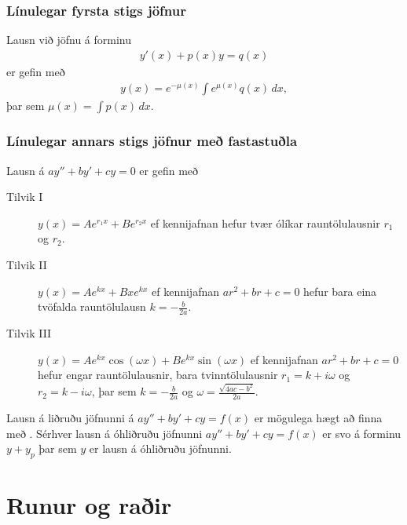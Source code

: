 \documentclass[a4paper,10pt,icelandic]{sphinxmanual}
\begin{document}
\subsection{Línulegar fyrsta stigs jöfnur}
\label{\detokenize{kafli08:linulegar-fyrsta-stigs-jofnur}}
Lausn við jöfnu á forminu
\begin{equation*}
\begin{split}y'(x) + p(x)y = q(x)\end{split}
\end{equation*}
er gefin með
\begin{equation*}
\begin{split}y(x) = e^{-\mu(x)} \int e^{\mu(x)} q(x)\, dx,\end{split}
\end{equation*}
þar sem \(\mu(x) = \int p(x)\, dx\).


\subsection{Línulegar annars stigs jöfnur með fastastuðla}
\label{\detokenize{kafli08:linulegar-annars-stigs-jofnur-me-fastastula}}
Lausn á \(ay''+by'+cy=0\) er gefin með
\begin{description}
\item[{Tilvik I}] \leavevmode
\(y(x)=Ae^{r_1x}+Be^{r_2x}\)
ef kennijafnan hefur tvær ólíkar rauntölulausnir \(r_1\) og
\(r_2\).

\item[{Tilvik II}] \leavevmode
\(y(x)=Ae^{kx}+Bxe^{kx}\)
ef kennijafnan \(ar^2+br+c=0\) hefur bara eina tvöfalda rauntölulausn
\(k=-\frac{b}{2a}\).

\item[{Tilvik III}] \leavevmode
\(y(x)=Ae^{kx}\cos(\omega x)+Be^{kx}\sin(\omega x)\)
ef kennijafnan \(ar^2+br+c=0\) hefur engar rauntölulausnir,
bara tvinntölulausnir \(r_1=k+i\omega\) og
\(r_2=k-i\omega\), þar sem
\(k=-\frac{b}{2a}\) og \(\omega=\frac{\sqrt{4ac-b^2}}{2a}\).

\end{description}

Lausn á liðruðu jöfnunni  á \(ay''+by'+cy=f(x)\) er mögulega hægt að finna
með {\hyperref[\detokenize{kafli08:agiskun}]{}}. Sérhver lausn á óhliðruðu jöfnunni \(ay''+by'+cy=f(x)\)
er svo á forminu \(y+y_p\) þar sem \(y\) er
lausn á óhliðruðu jöfnunni.


\chapter{Runur og raðir}
\label{\detokenize{kafli09:runur-og-rair}}\label{\detokenize{kafli09::doc}}
\end{document}
